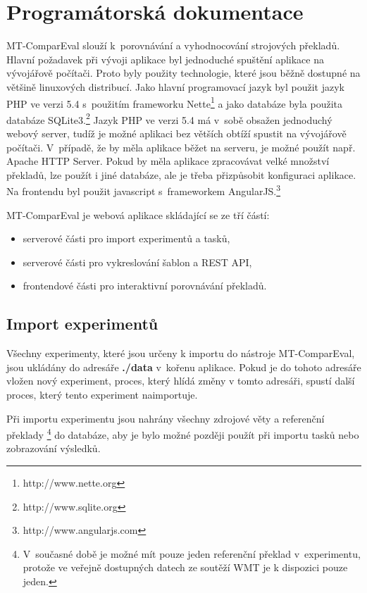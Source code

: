 \chapter{Programátorská dokumentace}
\label{chap:programmers}


\mbox{MT-ComparEval} slouží k~porovnávání a vyhodnocování strojových překladů.
Hlavní požadavek při vývoji aplikace byl jednoduché spuštění aplikace na vývojářově počítači.
Proto byly použity technologie,
  které jsou běžně dostupné na většině linuxových distribucí.
Jako hlavní programovací jazyk byl použit jazyk PHP ve verzi 5.4 
  s~použitím frameworku Nette\footnote{http://www.nette.org}
  a jako databáze byla použita databáze SQLite3.\footnote{http://www.sqlite.org}
Jazyk PHP ve verzi 5.4 má v~sobě obsažen jednoduchý webový server,
  tudíž je možné aplikaci bez větších obtíží spustit na vývojářově počítači.
V~případě, že by měla aplikace běžet na serveru,
  je možné použít např. Apache HTTP Server.
Pokud by měla aplikace zpracovávat velké množství překladů,
  lze použít i jiné databáze,
  ale je třeba přizpůsobit konfiguraci aplikace.
Na frontendu byl použit javascript s~frameworkem AngularJS.\footnote{http://www.angularjs.com}

\mbox{MT-ComparEval} je webová aplikace skládající se ze tří částí:
\begin{itemize}
	\item serverové části pro import experimentů a tasků,
	\item serverové části pro vykreslování šablon a REST API,
	\item frontendové části pro interaktivní porovnávání překladů.
\end{itemize}

\section{Import experimentů}
Všechny experimenty, které jsou určeny k importu do nástroje \mbox{MT-ComparEval},
  jsou ukládány do adresáře \textbf{./data} v~kořenu aplikace.
Pokud je do tohoto adresáře vložen nový experiment,
  proces, který hlídá změny v tomto adresáři,
  spustí další proces, který tento experiment naimportuje.

Při importu experimentu jsou nahrány všechny zdrojové věty
  a referenční překlady \footnote{
	V~současné době je možné mít pouze jeden referenční překlad v~experimentu,
	protože ve veřejně dostupných datech ze soutěží WMT je k dispozici pouze jeden. }
  do databáze,
  aby je bylo možné později použít při importu tasků
  nebo zobrazování výsledků.

